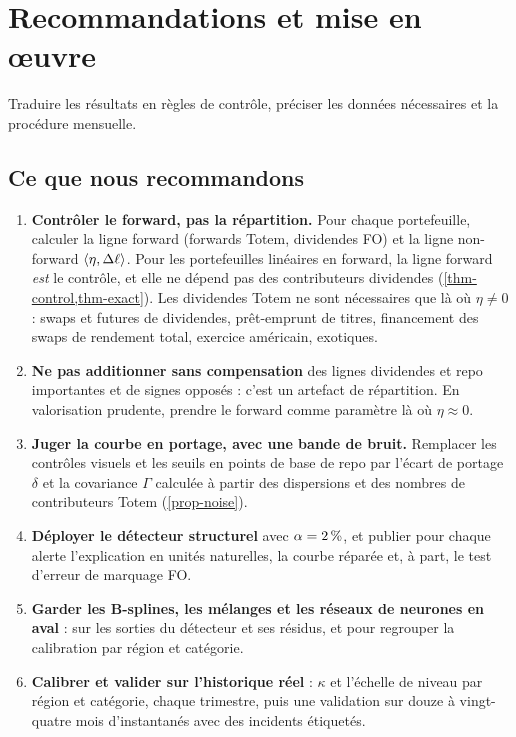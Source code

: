 \section{Recommandations et mise en œuvre}\label{sec-reco}

\begin{objectif}
Traduire les résultats en règles de contrôle, préciser les données nécessaires et la procédure mensuelle.
\end{objectif}

\subsection{Ce que nous recommandons}
\begin{enumerate}
\item \textbf{Contrôler le forward, pas la répartition.} Pour chaque portefeuille, calculer la ligne forward
(forwards Totem, dividendes FO) et la ligne non-forward $\langle \eta, \Delta\ell\rangle$. Pour les portefeuilles linéaires en
forward, la ligne forward \emph{est} le contrôle, et elle ne dépend pas des contributeurs dividendes
(\cref{thm-control,thm-exact}). Les dividendes Totem ne sont nécessaires que là où $\eta\ne0$ : swaps et futures de
dividendes, prêt-emprunt de titres, financement des swaps de rendement total, exercice américain, exotiques.
\item \textbf{Ne pas additionner sans compensation} des lignes dividendes et repo importantes et de signes opposés :
c'est un artefact de répartition. En valorisation prudente, prendre le forward comme paramètre là où $\eta\approx0$.
\item \textbf{Juger la courbe en portage, avec une bande de bruit.} Remplacer les contrôles visuels et les seuils en
points de base de repo par l'écart de portage $\delta$ et la covariance $\Gamma$ calculée à partir des dispersions et
des nombres de contributeurs Totem (\cref{prop-noise}).
\item \textbf{Déployer le détecteur structurel} avec $\alpha=\pct{2}$, et publier pour chaque alerte l'explication en
unités naturelles, la courbe réparée et, à part, le test d'erreur de marquage FO.
\item \textbf{Garder les B-splines, les mélanges et les réseaux de neurones en aval} : sur les sorties du détecteur et
ses résidus, et pour regrouper la calibration par région et catégorie.
\item \textbf{Calibrer et valider sur l'historique réel} : $\kappa$ et l'échelle de niveau par région et catégorie,
chaque trimestre, puis une validation sur douze à vingt-quatre mois d'instantanés avec des incidents étiquetés.
\end{enumerate}

